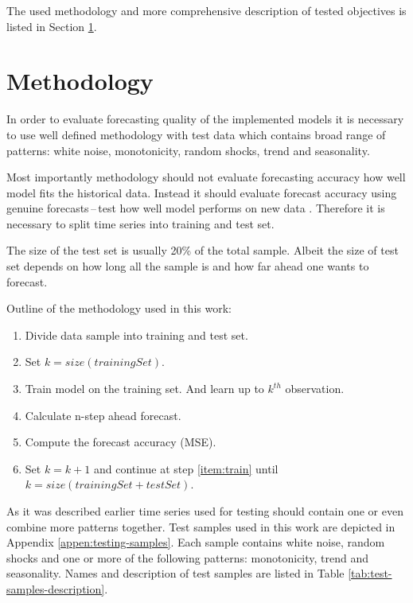 The used methodology and more comprehensive description of tested objectives is listed in Section \ref{sec:methodology}.

    \section{Methodology} \label{sec:methodology}
    In order to evaluate forecasting quality of the implemented models it is necessary to use well defined
    methodology with test data which contains broad range of patterns: white noise, monotonicity, random
    shocks, trend and seasonality.

    Most importantly methodology should not evaluate forecasting accuracy how well model
    fits the historical data. Instead it should evaluate forecast accuracy using genuine forecasts\,--\,test
    how well model performs on new data \cite{otexts}. Therefore it is necessary to split time series into training
    and test set.

    The size of the test set is usually 20\% of the total sample. Albeit the size of test set depends on how
    long all the sample is and how far ahead one wants to forecast.

    Outline of the methodology used in this work:
    \begin{enumerate} \label{enum:methodology}
        \item Divide data sample into training and test set.
        \item Set $k = size(trainingSet)$.
        \item Train model on the training set. And learn up to $k^{th}$ observation. \label{item:train}
        \item Calculate n-step ahead forecast.
        \item Compute the forecast accuracy (MSE).
        \item Set $k = k+1$ and continue at step \ref{item:train} until $k=size(trainingSet + testSet)$.
    \end{enumerate}

    As it was described earlier time series used for testing should contain one or even combine more patterns together.
    Test samples used in this work are depicted in Appendix \ref{appen:testing-samples}. Each sample contains white
    noise, random shocks and one or more of the following patterns: monotonicity, trend and seasonality. Names and
    description of test samples are listed in Table \ref{tab:test-samples-description}.

